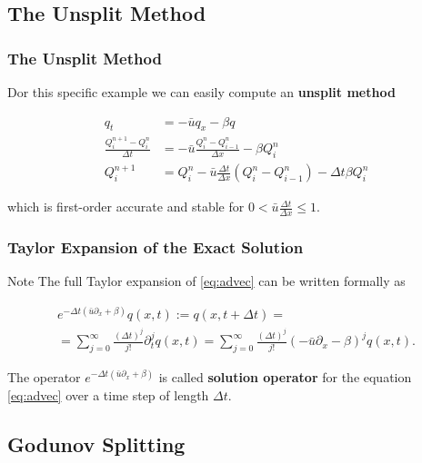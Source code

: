 \documentclass{beamer}
\renewcommand{\d}{\Delta}
\newcommand{\emp}[1]{\textcolor{tum}{\textbf{#1}}}
\begin{document}
\subsection{The Unsplit Method}

\begin{frame}
	\frametitle{The Unsplit Method}
	Dor this specific example we can easily compute an \emp{unsplit method}

	\begin{align*}\label{eq:unsplit}
		q_t                          & = -\bar{u}q_x-\beta q                                              \\
		\frac{Q^{n+1}_i-Q^n_i}{\d t} & = -\bar{u} \frac{Q^n_i-Q^n_{i-1}}{\d x}-\beta Q^n_i                \\
		Q^{n+1}_i                    & = Q^n_i-\bar{u} \frac{\d t}{\d x}(Q^n_i-Q^n_{i-1})-\d t\beta Q^n_i
	\end{align*}

	which is first-order accurate and stable for $0<\bar{u}\frac{\d t}{\d x}\leq1$.
\end{frame}

\begin{frame}
	\frametitle{Taylor Expansion of the Exact Solution}
	\begin{block}{Note}
		The full Taylor expansion of \eqref{eq:advec} can be written formally as

		\begin{equation}\label{eq:sol_op}
			\begin{gathered}
				e^{-\d t(\bar{u}\partial_x+\beta)}q(x,t):=q(x,t+\d t)=\\
				=\sum_{j=0}^{\infty}\frac{(\d t)^j}{j!}\partial_t^jq(x,t)=\sum_{j=0}^{\infty}\frac{(\d t)^j}{j!}(-\bar{u}\partial_x-\beta)^jq(x,t).
			\end{gathered}
		\end{equation}

		The operator $e^{-\d t(\bar{u}\partial_x+\beta)}$ is called \emp{solution operator} for the equation \eqref{eq:advec} over a time step of length $\d t$.
	\end{block}
\end{frame}












\subsection{Godunov Splitting}
\end{document}
